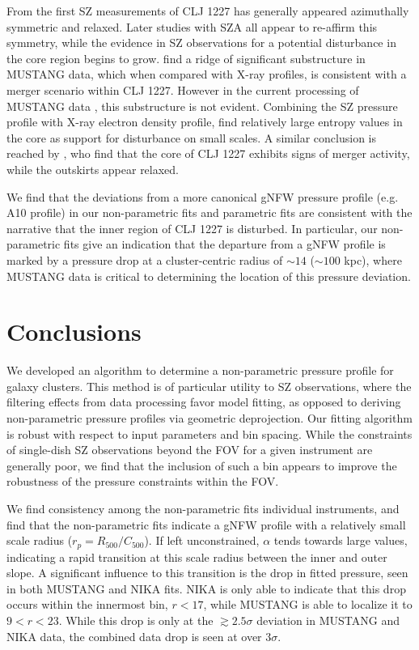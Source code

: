 \documentclass[iop,numberedappendix,apj]{emulateapj}
\begin{document}
From the first SZ measurements of CLJ 1227 \citep[made with BIMA][]{joy2001} has generally appeared
azimuthally symmetric and relaxed. Later studies with SZA \citep{muchovej2007,mroczkowski2009,mroczkowski2011}
all appear to re-affirm this symmetry, while the evidence in SZ observations for a potential disturbance
in the core region begins to grow. \citet{korngut2011} find a ridge of significant substructure in
MUSTANG data, which when compared with X-ray profiles, is consistent with a merger scenario within
CLJ 1227. However in the current processing of MUSTANG data \citep{romero2016},
this substructure is not evident. Combining the SZ pressure profile with X-ray electron density profile,
\citet{adam2015} find relatively large entropy values in the core as support for disturbance on small scales.
A similar conclusion is reached by \citet{rumsey2016}, who find that the core
of CLJ 1227 exhibits signs of merger activity, while the outskirts appear relaxed.

We find that the deviations from a more canonical gNFW pressure profile (e.g. A10 profile) in our
non-parametric fits and parametric fits are consistent with the narrative that the inner region of
CLJ 1227 is disturbed. In particular, our non-parametric fits give an indication that the departure
from a gNFW profile is marked by a pressure drop at a cluster-centric radius of $\sim 14$\asecs
($\sim 100$ kpc), where MUSTANG data is critical to determining the location of this pressure deviation.


\section{Conclusions}
\label{sec:conclusions}

We developed an algorithm to determine a non-parametric pressure profile for galaxy clusters.
This method is of particular utility to SZ observations, where the filtering effects from data
processing favor model fitting, as opposed to deriving non-parametric pressure profiles via
geometric deprojection. Our fitting algorithm is robust with respect to input parameters and
bin spacing. While the constraints of single-dish SZ observations beyond the FOV for a given
instrument are generally poor, we find that the inclusion of such a bin appears to improve
the robustness of the pressure constraints within the FOV.

We find consistency among the non-parametric fits individual instruments, and find that the
non-parametric fits indicate a gNFW profile with a relatively small scale radius
($r_p = R_{500}/C_{500}$). If left unconstrained, $\alpha$ tends towards large values, indicating
a rapid transition at this scale radius between the inner and outer slope. A significant
influence to this transition is the drop in fitted pressure, seen in both MUSTANG and NIKA
fits. NIKA is only able to indicate that this drop occurs within the innermost bin, $r < 17$\asec,
while MUSTANG is able to localize it to $9 < r < 23$\asec. While this drop is only at the
$\gtrsim 2.5 \sigma$ deviation in MUSTANG and NIKA data, the combined data drop is seen at over
$3 \sigma$.
\end{document}
